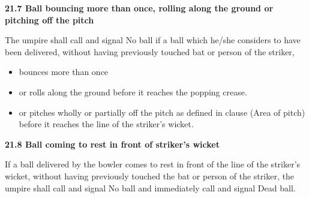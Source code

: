 \documentclass[12pt]{article}
\begin{document}
\vspace{\baselineskip}
{\fontsize{11pt}{13.2pt}\selectfont \textbf{21.7 \tabto{0.47in} Ball bouncing more than once, rolling along the ground or pitching off the pitch}\par}\par


\vspace{\baselineskip}
\begin{adjustwidth}{0.0in}{0.39in}
{\fontsize{9pt}{10.8pt}\selectfont The umpire shall call and signal No ball if a ball which he/she considers to have been delivered, without having previously touched bat or person of the striker,\par}\par

\end{adjustwidth}


\vspace{\baselineskip}
\begin{itemize}
	\item {\fontsize{9pt}{10.8pt}\selectfont bounces more than once\par}\par


\vspace{\baselineskip}
	\item {\fontsize{9pt}{10.8pt}\selectfont or rolls along the ground before it reaches the popping crease.\par}\par


\vspace{\baselineskip}
	\item {\fontsize{9pt}{10.8pt}\selectfont or pitches wholly or partially off the pitch as defined in clause (Area of pitch) before it reaches the line of the striker’s wicket.\par}
\end{itemize}\par


\vspace{\baselineskip}
{\fontsize{11pt}{13.2pt}\selectfont \textbf{21.8 \tabto{0.47in} Ball coming to rest in front of striker’s wicket}\par}\par


\vspace{\baselineskip}
\begin{adjustwidth}{0.0in}{0.04in}
{\fontsize{9pt}{10.8pt}\selectfont If a ball delivered by the bowler comes to rest in front of the line of the striker’s wicket, without having previously touched the bat or person of the striker, the umpire shall call and signal No ball and immediately call and signal Dead ball.\par}\par

\end{adjustwidth}
\end{document}
